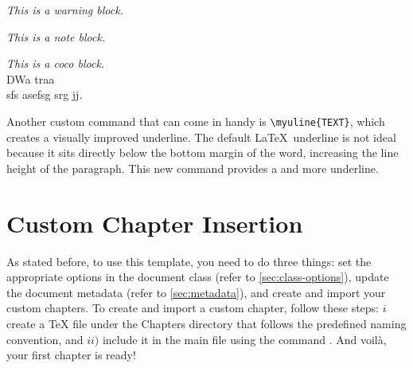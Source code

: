 {\begin{tcbraster}[
    raster columns=2, 
    raster equal height, 
    nobeforeafter, 
    raster column skip=2cm
]
\begin{block}[warning]
    \textit{This is a warning block.}
\end{block}
\begin{block}[note]
    \textit{This is a note block.}
\end{block}
\end{tcbraster}
\vspace{.875em}

\begin{block}[coco]
    \textit{This is a coco block.}\\
    DWa traa\\
    sfs asefsg srg jj.
\end{block}

Another custom command that can come in handy is \verb|\myuline{TEXT}|, which creates a visually improved underline. The default \LaTeX~underline is not ideal because it sits directly below the bottom margin of the word, increasing the line height of the paragraph. This new command provides a  and more  underline.

\section{Custom Chapter Insertion}
As stated before, to use this template, you need to do three things: set the appropriate options in the document class (refer to \autoref{sec:class-options}), update the document metadata (refer to \autoref{sec:metadata}), and create and import your custom chapters. To create and import a custom chapter, follow these steps: \(i\) create a TeX file under the Chapters directory that follows the predefined naming convention, and \(ii)\) include it in the main file using the command \verb||. And voilà, your first chapter is ready!
}